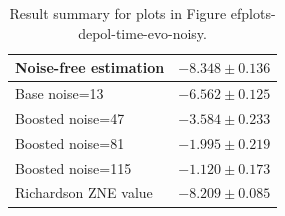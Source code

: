 \begin{table}
\caption{Result summary for plots in Figure 
ef{plots-depol-time-evo-noisy}.}
\begin{tabular*}{\textwidth}{@{\extracolsep{\fill}}ll@{}}
\toprule

Noise-free estimation & $-8.348 \pm 0.136$ \\
\midrule
Base noise=13 & $-6.562 \pm 0.125$ \\
Boosted noise=47 & $-3.584 \pm 0.233$ \\
Boosted noise=81 & $-1.995 \pm 0.219$ \\
Boosted noise=115 & $-1.120 \pm 0.173$ \\
\midrule
Richardson ZNE value & $-8.209 \pm 0.085$ \\
\bottomrule
\end{tabular*}
\label{table-dephasing-time-evo-noisy}
\end{table}
